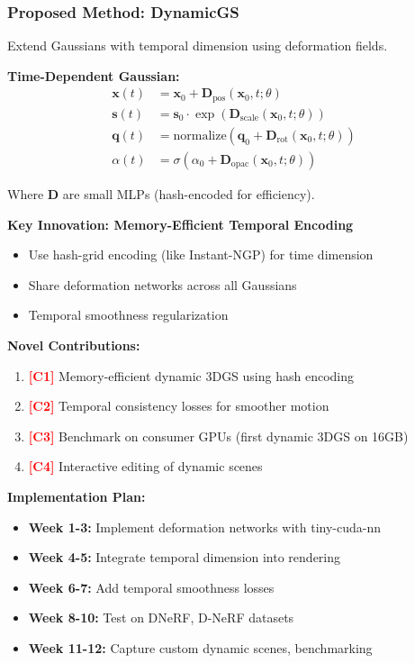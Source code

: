 \documentclass[11pt,letterpaper]{article}
\newcommand{\method}[1]{\textbf{#1}}
\newcommand{\contribution}[1]{\textcolor{red}{\textbf{[#1]}}}
\begin{document}
\subsubsection{Proposed Method: \method{DynamicGS}}

Extend Gaussians with temporal dimension using deformation fields.

\textbf{Time-Dependent Gaussian:}
\begin{align*}
\mathbf{x}(t) &= \mathbf{x}_0 + \mathbf{D}_{\text{pos}}(\mathbf{x}_0, t; \theta) \\
\mathbf{s}(t) &= \mathbf{s}_0 \cdot \exp(\mathbf{D}_{\text{scale}}(\mathbf{x}_0, t; \theta)) \\
\mathbf{q}(t) &= \text{normalize}(\mathbf{q}_0 + \mathbf{D}_{\text{rot}}(\mathbf{x}_0, t; \theta)) \\
\alpha(t) &= \sigma(\alpha_0 + \mathbf{D}_{\text{opac}}(\mathbf{x}_0, t; \theta))
\end{align*}

Where $\mathbf{D}$ are small MLPs (hash-encoded for efficiency).

\textbf{Key Innovation: Memory-Efficient Temporal Encoding}
\begin{itemize}[leftmargin=*]
    \item Use hash-grid encoding (like Instant-NGP) for time dimension
    \item Share deformation networks across all Gaussians
    \item Temporal smoothness regularization
\end{itemize}

\textbf{Novel Contributions:}
\begin{enumerate}[leftmargin=*]
    \item \contribution{C1} Memory-efficient dynamic 3DGS using hash encoding
    \item \contribution{C2} Temporal consistency losses for smoother motion
    \item \contribution{C3} Benchmark on consumer GPUs (first dynamic 3DGS on 16GB)
    \item \contribution{C4} Interactive editing of dynamic scenes
\end{enumerate}

\textbf{Implementation Plan:}
\begin{itemize}[leftmargin=*]
    \item \textbf{Week 1-3:} Implement deformation networks with tiny-cuda-nn
    \item \textbf{Week 4-5:} Integrate temporal dimension into rendering
    \item \textbf{Week 6-7:} Add temporal smoothness losses
    \item \textbf{Week 8-10:} Test on DNeRF, D-NeRF datasets
    \item \textbf{Week 11-12:} Capture custom dynamic scenes, benchmarking
\end{itemize}
\end{document}
